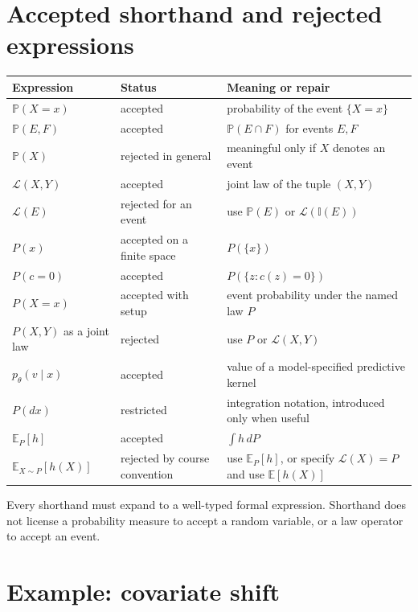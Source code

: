 \documentclass[11pt]{article}
\newcommand{\E}{\mathbb E}
\newcommand{\I}{\mathbb I}
\renewcommand{\P}{\mathbb P}
\newcommand{\Law}{\mathcal L}
\begin{document}
\section{Accepted shorthand and rejected expressions}

\begin{center}
\renewcommand{\arraystretch}{1.3}
\begin{tabular}{p{}p{}p{}}
\toprule
Expression & Status & Meaning or repair\\
\midrule
\(\P(X=x)\) & accepted & probability of the event \(\{X=x\}\)\\
\(\P(E,F)\) & accepted & \(\P(E\cap F)\) for events \(E,F\)\\
\(\P(X)\) & rejected in general & meaningful only if \(X\) denotes an event\\
\(\Law(X,Y)\) & accepted & joint law of the tuple \((X,Y)\)\\
\(\Law(E)\) & rejected for an event & use \(\P(E)\) or \(\Law(\I(E))\)\\
\(P(x)\) & accepted on a finite space & \(P(\{x\})\)\\
\(P(c=0)\) & accepted & \(P(\{z:c(z)=0\})\)\\
\(P(X=x)\) & accepted with setup & event probability under the named law \(P\)\\
\(P(X,Y)\) as a joint law & rejected & use \(P\) or \(\Law(X,Y)\)\\
\(p_\theta(v\mid x)\) & accepted & value of a model-specified predictive kernel\\
\(P(dx)\) & restricted & integration notation, introduced only when useful\\
\(\E_P[h]\) & accepted & \(\int h\,dP\)\\
\(\E_{X\sim P}[h(X)]\) & rejected by course convention & use \(\E_P[h]\), or specify \(\Law(X)=P\) and use \(\E[h(X)]\)\\
\bottomrule
\end{tabular}
\end{center}

Every shorthand must expand to a well-typed formal expression. Shorthand does
not license a probability measure to accept a random variable, or a law
operator to accept an event.

\section{Example: covariate shift}
\end{document}
